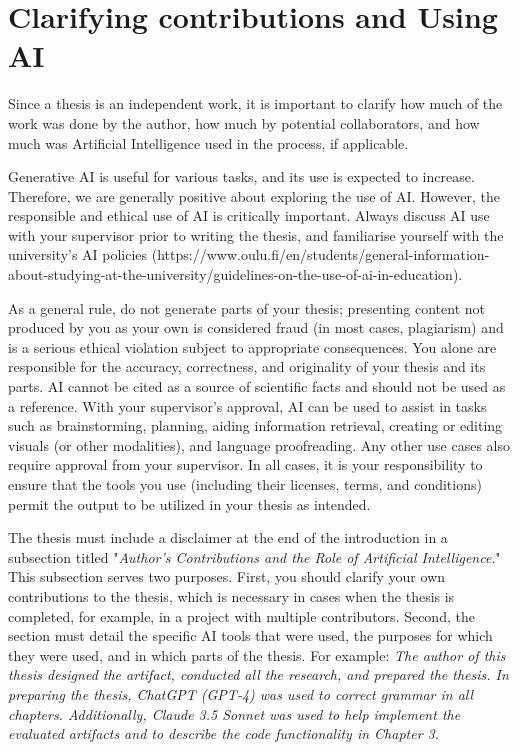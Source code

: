 \section{Clarifying contributions and Using AI}
\label{AI}
Since a thesis is an independent work, it is important to clarify how
much of the work was done by the author, how much by potential
collaborators, and how much was Artificial Intelligence used in the
process, if applicable.

Generative AI is useful for various tasks, and its use is expected to
increase. Therefore, we are generally positive about exploring the
use of AI. However, the responsible and ethical use of AI is
critically important. Always discuss AI use with your supervisor
prior to writing the thesis, and familiarise yourself with the
university's AI policies
(https://www.oulu.fi/en/students/general-information-about-studying-at-the-university/guidelines-on-the-use-of-ai-in-education).

As a general rule, do not generate parts of your thesis; presenting
content not produced by you as your own is considered fraud (in most
cases, plagiarism) and is a serious ethical violation subject to
appropriate consequences. You alone are responsible for the accuracy,
correctness, and originality of your thesis and its parts. AI cannot
be cited as a source of scientific facts and should not be used as a
reference. With your supervisor's approval, AI can be used to assist
in tasks such as brainstorming, planning, aiding information
retrieval, creating or editing visuals (or other modalities), and
language proofreading. Any other use cases also require approval from
your supervisor. In all cases, it is your responsibility to ensure
that the tools you use (including their licenses, terms, and
conditions) permit the output to be utilized in your thesis as intended.

The thesis must include a disclaimer at the end of the introduction
in a subsection titled "\textit{Author's Contributions and the Role
of Artificial Intelligence}." This subsection serves two purposes.
First, you should clarify your own contributions to the thesis, which
is necessary in cases when the thesis is completed, for example, in a
project with multiple contributors. Second, the section must detail
the specific AI tools that were used, the purposes for which they
were used, and in which parts of the thesis. For example: \textit{The
author of this thesis designed the artifact, conducted all the
research, and prepared the thesis. In preparing the thesis, ChatGPT
(GPT-4) was used to correct grammar in all chapters. Additionally,
Claude 3.5 Sonnet was used to help implement the evaluated artifacts
and to describe the code functionality in Chapter 3.}

